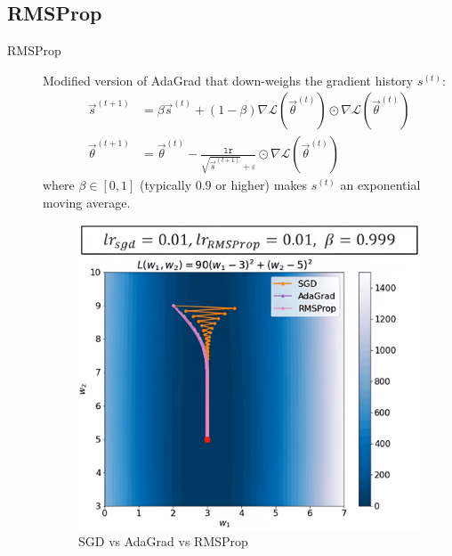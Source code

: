 \subsection{RMSProp}

\begin{description}
    \item[RMSProp] 
        Modified version of AdaGrad that down-weighs the gradient history $s^{(t)}$:
        \[
            \begin{split}
                \vec{s}^{(t+1)} &= \beta \vec{s}^{(t)} + (1-\beta) \nabla\mathcal{L}(\vec{\theta}^{(t)}) \odot \nabla\mathcal{L}(\vec{\theta}^{(t)}) \\
                \vec{\theta}^{(t+1)} &= \vec{\theta}^{(t)} - \frac{\texttt{lr}}{\sqrt{\vec{s}^{(t+1)}} + \varepsilon} \odot \nabla\mathcal{L}(\vec{\theta}^{(t)})
            \end{split}
        \]
        where $\beta \in [0, 1]$ (typically $0.9$ or higher) makes $s^{(t)}$ an exponential moving average.

        \begin{figure}[H]
            \centering
            \includegraphics[width=0.4\linewidth]{./img/rmsprop.png}
            \caption{SGD vs AdaGrad vs RMSProp}
        \end{figure}
\end{description}